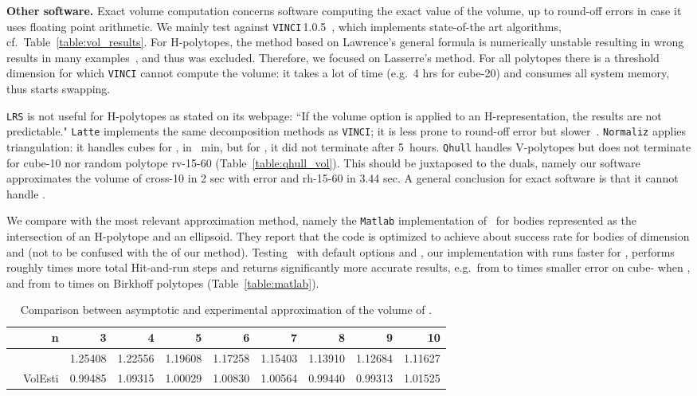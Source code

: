 \documentclass[11pt,a4paper]{article}
\begin{document}
\vspace{.5em}
\textbf{Other software.}
Exact volume computation concerns software computing the exact value of
the volume, up to round-off errors in case it uses floating point arithmetic. 
We mainly test against {\tt VINCI}\,1.0.5~\cite{vinci}, which implements
state-of-the art algorithms, cf.\ Table~\ref{table:vol_results}.
For H-polytopes, the method based on Lawrence's general formula 
is numerically unstable resulting in wrong results in many examples~\cite{FukVolume00},
and thus was excluded.
Therefore, we focused on Lasserre's method. 
For all polytopes there is a threshold dimension for which
{\tt VINCI} cannot compute the volume:
it takes a lot of time (e.g.\  4 hrs for cube-20) and 
consumes all system memory, thus starts swapping.

{\tt LRS} is not useful for H-polytopes as stated on its webpage:
``If the volume option
is applied to an H-representation, the results are not predictable."
{\tt Latte} implements the same decomposition methods
as {\tt VINCI}; it is less prone to round-off error but slower~\cite{Latte}.
{\tt Normaliz} applies triangulation:
it handles cubes for , in ~min,
but for , it did not terminate after 5~hours.
{\tt Qhull} handles V-polytopes
but does not terminate for cube-10 nor random polytope rv-15-60
(Table~\ref{table:qhull_vol}). 
This should be juxtaposed to the duals, namely
our software approximates the volume of cross-10 in 2 sec with  error and 
rh-15-60 in 3.44 sec.
A general conclusion for exact software is that it cannot handle
.

We compare with the most relevant approximation method, namely the
{\tt Matlab} implementation of~\cite{CousinsV13_matlab} for bodies
represented as the intersection of an H-polytope and an ellipsoid.
They report that the code is optimized to achieve about  success
rate for bodies of dimension  and  (not to be confused with the  of our method).
Testing~\cite{CousinsV13_matlab} with default options and
, our implementation with  runs faster for , performs  roughly  times more total Hit-and-run steps and returns significantly
more accurate results, e.g.\ from  to  times smaller error
on cube- when , and from  to  times on Birkhoff polytopes (Table~\ref{table:matlab}).

\begin{table}[t!]\centering\small
\begin{tabular}{rr|rrrrrrrr}
& n & 3 & 4 & 5 & 6 & 7 & 8 & 9 & 10\\\hline
\multirow{2}{1cm}{} & \cite{GMcKay09} & 1.25408 & 1.22556 & 1.19608 & 1.17258 & 1.15403 & 1.13910 & 1.12684 & 1.11627\\
& VolEsti & 0.99485 & 1.09315 & 1.00029 & 1.00830 & 1.00564 & 0.99440 & 0.99313 & 1.01525\\  
\end{tabular} 
\caption{ Comparison between asymptotic and experimental approximation of the volume of .
\label{table:birk_asymptotic}}
\end{table}
\end{document}
